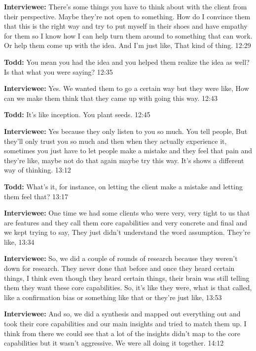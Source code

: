 \textbf{Interviewee:} There's some things you have to think about with the client from their perspective. Maybe they're not open to something. How do I convince them that this is the right way and try to put myself in their shoes and have empathy for them so I know how I can help turn them around to something that can work. Or help them come up with the idea. And I'm just like,  That kind of thing. 12:29

\textbf{Todd:} You mean you had the idea and you helped them realize the idea as well? Is that what you were saying? 12:35

\textbf{Interviewee:} Yes. We wanted them to go a certain way but they were like,  How can we make them think that they came up with going this way. 12:43

\textbf{Todd:} It's like inception. You plant seeds. 12:45

\textbf{Interviewee:} Yes because they only listen to you so much. You tell people,  But they'll only trust you so much and then when they actually experience it, sometimes you just have to let people make a mistake and they feel that pain and they're like,  maybe not do that again maybe try this way.  It's shows a different way of thinking. 13:12

\textbf{Todd:} What's it, for instance, on letting the client make a mistake and letting them feel that? 13:17

\textbf{Interviewee:} One time we had some clients who were very, very tight to us that are features and they call them core capabilities and very concrete and final and we kept trying to say,  They just didn't understand the word assumption. They're like,  13:34

\textbf{Interviewee:} So, we did a couple of rounds of research because they weren't down for research. They never done that before and once they heard certain things, I think even though they heard certain things, their brain was still telling them they want these core capabilities. So, it's like they were, what is that called, like a confirmation bias or something like that or they're just like,  13:53

\textbf{Interviewee:} And so, we did a synthesis and mapped out everything out and took their core capabilities and our main insights and tried to match them up. I think from there we could see that a lot of the insights didn't map to the core capabilities but it wasn't aggressive. We were all doing it together. 14:12

